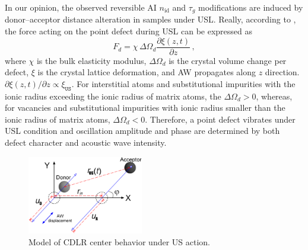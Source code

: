 \documentclass[aip,jap, amsmath,amssymb,reprint]{revtex4-1}
\begin{document}
In our opinion, the observed reversible AI $n_{\mathrm{id}}$ and $\tau_g$ modifications are induced by
donor--acceptor distance alteration in samples under USL.
Really, according to \cite{MirzadeJAP2011,PeleshchakUJF2016}, the force acting on the point defect during USL can be expressed as
\begin{equation}
\label{eqFd}
F_d=\chi\,\Delta\Omega_d\frac{\partial \xi(z,t)}{\partial z}\,,
\end{equation}
where
$\chi$ is the bulk elasticity modulus,
$\Delta\Omega_d$ is the crystal volume change per defect,
$\xi$ is the crystal lattice deformation,
and AW propagates along $z$ direction.
$\partial \xi(z,t)/\partial z\propto \xi_{\mathtt{US}}$.
For interstitial atoms and substitutional impurities with the ionic radius exceeding the ionic radius of matrix
atoms, the $\Delta\Omega_d > 0$, whereas,
for vacancies and substitutional impurities with ionic radius smaller than the ionic radius of matrix atoms,
$\Delta\Omega_d < 0$.
Therefore, a point defect vibrates under USL condition and oscillation amplitude and phase are determined by both defect character and acoustic wave intensity.

\begin{figure}
\includegraphics[width=0.45\textwidth]{olikhFig4}%
\caption{\label{fig_Model}
Model of CDLR center behavior under US action.
}%
\end{figure}
\end{document}
